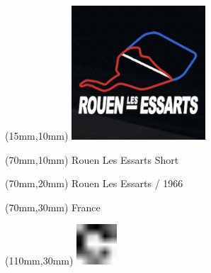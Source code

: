 \null\newpage
\begin{textblock*}{50mm}(15mm,10mm)%
\includegraphics[width=50mm]{LG/ROUE.png}
\end{textblock*}
\begin{textblock*}{130mm}(70mm,10mm)%
{\fontsize{20}{20}\selectfont Rouen Les Essarts Short}\\
\end{textblock*}
\begin{textblock*}{120mm}(70mm,20mm)%
{\fontsize{16}{16}\selectfont Rouen Les Essarts / 1966}\\
\end{textblock*}
\begin{textblock*}{120mm}(70mm,30mm)%
{\fontsize{12}{12}\selectfont France}
\end{textblock*}
\begin{textblock*}{30mm}(110mm,30mm)%
\centering
\includegraphics[height=15mm]{icons/fa-rotate-right.pdf}
\end{textblock*}
